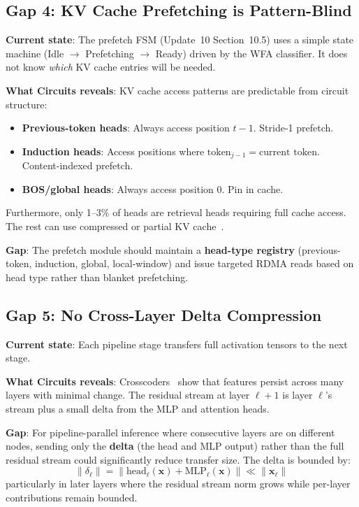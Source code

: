 \documentclass[11pt,letterpaper]{article}
\begin{document}
\subsection{Gap 4: KV Cache Prefetching is Pattern-Blind}

\textbf{Current state}: The prefetch FSM (Update~10 Section~10.5) uses a simple state machine (Idle $\to$ Prefetching $\to$ Ready) driven by the WFA classifier. It does not know \emph{which} KV cache entries will be needed.

\textbf{What Circuits reveals}: KV cache access patterns are predictable from circuit structure:
\begin{itemize}
    \item \textbf{Previous-token heads}: Always access position $t-1$. Stride-1 prefetch.
    \item \textbf{Induction heads}: Access positions where $\text{token}_{j-1} = \text{current token}$. Content-indexed prefetch.
    \item \textbf{BOS/global heads}: Always access position 0. Pin in cache.
\end{itemize}

Furthermore, only 1--3\% of heads are retrieval heads requiring full cache access. The rest can use compressed or partial KV cache~\cite{olsson2022induction}.

\textbf{Gap}: The prefetch module should maintain a \textbf{head-type registry} (previous-token, induction, global, local-window) and issue targeted RDMA reads based on head type rather than blanket prefetching.

\subsection{Gap 5: No Cross-Layer Delta Compression}

\textbf{Current state}: Each pipeline stage transfers full activation tensors to the next stage.

\textbf{What Circuits reveals}: Crosscoders~\cite{anthropic2024crosscoders} show that features persist across many layers with minimal change. The residual stream at layer $\ell+1$ is layer $\ell$'s stream plus a small delta from the MLP and attention heads.

\textbf{Gap}: For pipeline-parallel inference where consecutive layers are on different nodes, sending only the \textbf{delta} (the head and MLP output) rather than the full residual stream could significantly reduce transfer size. The delta is bounded by:
\begin{equation}
    \|\delta_\ell\| = \|\text{head}_\ell(\mathbf{x}) + \text{MLP}_\ell(\mathbf{x})\| \ll \|\mathbf{x}_\ell\|
\end{equation}
particularly in later layers where the residual stream norm grows while per-layer contributions remain bounded.
\end{document}
